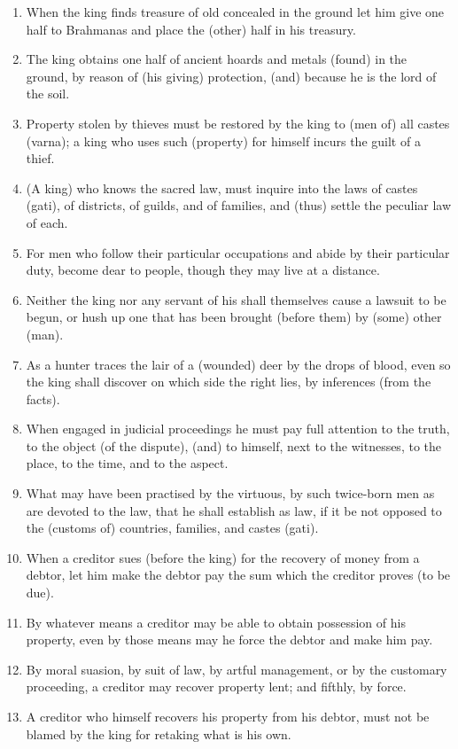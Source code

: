 \begin{enumerate}
\item When the king finds treasure of old concealed in the ground let him give one half to Brahmanas and place the (other) half in his treasury.
\item The king obtains one half of ancient hoards and metals (found) in the ground, by reason of (his giving) protection, (and) because he is the lord of the soil.
\item Property stolen by thieves must be restored by the king to (men of) all castes (varna); a king who uses such (property) for himself incurs the guilt of a thief.
\item (A king) who knows the sacred law, must inquire into the laws of castes (gati), of districts, of guilds, and of families, and (thus) settle the peculiar law of each.
\item For men who follow their particular occupations and abide by their particular duty, become dear to people, though they may live at a distance.
\item Neither the king nor any servant of his shall themselves cause a lawsuit to be begun, or hush up one that has been brought (before them) by (some) other (man).
\item As a hunter traces the lair of a (wounded) deer by the drops of blood, even so the king shall discover on which side the right lies, by inferences (from the facts).
\item When engaged in judicial proceedings he must pay full attention to the truth, to the object (of the dispute), (and) to himself, next to the witnesses, to the place, to the time, and to the aspect.
\item What may have been practised by the virtuous, by such twice-born men as are devoted to the law, that he shall establish as law, if it be not opposed to the (customs of) countries, families, and castes (gati).
\item When a creditor sues (before the king) for the recovery of money from a debtor, let him make the debtor pay the sum which the creditor proves (to be due).
\item By whatever means a creditor may be able to obtain possession of his property, even by those means may he force the debtor and make him pay.
\item By moral suasion, by suit of law, by artful management, or by the customary proceeding, a creditor may recover property lent; and fifthly, by force.
\item A creditor who himself recovers his property from his debtor, must not be blamed by the king for retaking what is his own.

\end{enumerate}
